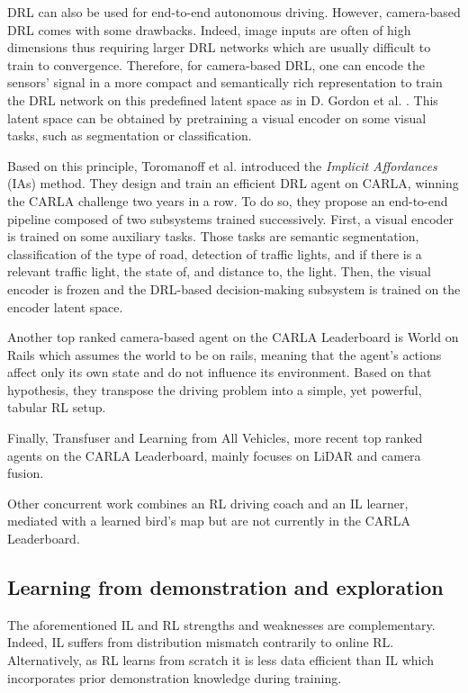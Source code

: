 \documentclass[letterpaper, 10 pt, conference]{ieeeconf}
\begin{document}
DRL can also be used for end-to-end autonomous driving. However, camera-based DRL comes with some drawbacks. Indeed, image inputs are often of high dimensions thus requiring larger DRL networks which are usually difficult to train to convergence. Therefore, for camera-based DRL, one can encode the sensors' signal in a more compact and semantically rich representation to train the DRL network on this predefined latent space as in D. Gordon et al. \cite{splitnet}. This latent space can be obtained by pretraining a visual encoder on some visual tasks, such as segmentation or classification. 




Based on this principle, Toromanoff et al. \cite{architecture-marin} introduced the \textit{Implicit Affordances} (IAs) method. They design and train an efficient DRL agent on CARLA, winning the CARLA challenge two years in a row. To do so, they propose an end-to-end pipeline composed of two subsystems trained successively. First, a visual encoder is trained on some auxiliary tasks. Those tasks are semantic segmentation, classification of the type of road, detection of traffic lights, and if there is a relevant traffic light, the state of, and distance to, the light. Then, the visual encoder is frozen and the DRL-based decision-making subsystem is trained on the encoder latent space.


Another top ranked camera-based agent on the CARLA Leaderboard is World on Rails \cite{wor} which assumes the world to be on rails, meaning that the agent's actions affect only its own state and do not influence its environment. Based on that hypothesis, they transpose the driving problem into a simple, yet powerful, tabular RL setup.

Finally, Transfuser \cite{transfuser} and Learning from All Vehicles, more recent top ranked agents on the CARLA Leaderboard, mainly focuses on LiDAR and camera fusion.

Other concurrent work combines an RL driving coach and an IL learner, mediated with a learned bird's map  \cite{roach} but are not currently in the CARLA Leaderboard.

\subsection{Learning from demonstration and exploration}




The aforementioned IL and RL strengths and weaknesses are complementary. Indeed, IL suffers from distribution mismatch contrarily to online RL. Alternatively, as RL learns from scratch it is less data efficient than IL which incorporates prior demonstration knowledge during training.
\end{document}
